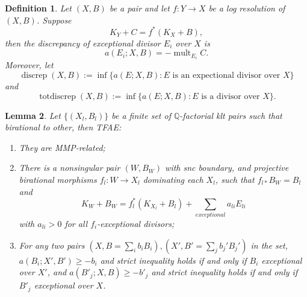 \documentclass{article}
\newtheorem{defn}{Definition}[subsection]
\newtheorem{lem}[defn]{Lemma}
\begin{document}
\begin{defn}
  Let $(X,B)$ be a pair  and let  $f:Y\to X$ be a log resolution of $(X,B)$. Suppose
  \[
  K_{Y}+C=f^*(K_{X}+B)
  ,\]
then the discrepancy  of exceptional divisor $E_{i}$ over $X$ is
\[
  a(E_{i};X,B)=-\operatorname{mult}_{E_{i}}C
.\]
 Moreover, let
\[
  \operatorname{discrep}(X, B) := \operatorname{inf}\{a(E; X, B) : E \text{ is an expectional divisor over } X \}
\]
and
\[
  \operatorname{totdiscrep}(X, B) :=\operatorname{inf}\{a(E; X, B) : E \text{ is a divisor over } X\}.
\]
\end{defn}
 \begin{lem}\label{MMPrelatedConditation}
  \cite[Proposition 3.4]{brunoLogSarkisovProgram1995}
  Let $ \{(X_l,B_l)\} $ be a finite set of $ \mathbb{Q} $-factorial klt pairs such that birational to other, then TFAE:
  \begin{enumerate}
    \item They are MMP-related;
    \item There is a nonsingular pair $ (W,B_W) $ with snc boundary, and projective birational morphisms $ f_l:W\to  X_l $ dominating each $ X_l $, such that $ f_{l*}B_W=B_l $ and
      \[ K_W+B_W=f_l^*(K_{X_l}+B_l)+\sum_{exceptional}{a_{li}E_{li}} \]
      with $ a_{li}>0 $ for all $ f_i $-exceptional divisors;
    \item For any two pairs $ (X,B=\sum_ib_iB_i),(X',B'=\sum _jb_j'B_j') $ in the set,  $ a(B_i;X',B')\geqslant -b_i $ and strict inequality holds if and only if $ B_i $ exceptional over $ X' $, and $ a(B'_j;X,B)\geqslant -b'_j $ and strict inequality holds if and only if $ B'_j $ exceptional over $ X $.
  \end{enumerate}
\end{lem}
\end{document}
